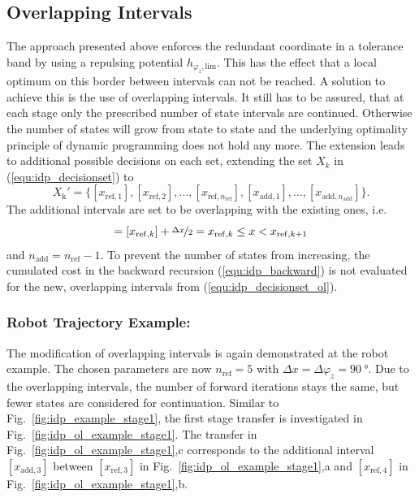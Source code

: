 \documentclass[runningheads]{llncs}
\begin{document}
\subsection{Overlapping Intervals}
\label{sec:overlapping}

The approach presented above enforces the redundant coordinate in a tolerance band by using a repulsing potential $h_{\varphi_{z},\mathrm{lim}}$.
This has the effect that a local optimum on this border between intervals can not be reached.
A solution to achieve this is the use of overlapping intervals.
It still has to be assured, that at each stage only the prescribed number of state intervals are continued.
Otherwise the number of states will grow from state to state and the underlying optimality principle of dynamic programming does not hold any more.
The extension leads to additional possible decisions on each set, extending the set $X_k$ in (\ref{equ:idp_decisionset}) to
%
\begin{equation}
X_\mathrm{k}'=
\{
[x_{\mathrm{ref},1}],[x_{\mathrm{ref},2}],...,[x_{\mathrm{ref},n_{\mathrm{ref}}}],
[x_{\mathrm{add},1}],...,[x_{\mathrm{add},n_{\mathrm{add}}}]
\}.
\label{equ:idp_decisionset_ol}
\end{equation}
%
The additional intervals are set to be overlapping with the existing ones, i.e.
%
\begin{equation}
[x_{\mathrm{add},k}]=[x_{\mathrm{ref},k}]+\nicefrac{\Delta x}{2}
= x_{\mathrm{ref},k} \le x <  x_{\mathrm{ref},k+1}
\end{equation}
%
and $n_{\mathrm{add}}=n_{\mathrm{ref}}-1$.
To prevent the number of states from increasing, the cumulated cost in the backward recursion (\ref{equ:idp_backward}) is not evaluated for the new, overlapping intervals from (\ref{equ:idp_decisionset_ol}).

\subsubsection{Robot Trajectory Example:}
The modification of overlapping intervals is again demonstrated at the robot example.
The chosen parameters are now $n_\mathrm{ref}=5$ with $\Delta x = \Delta \varphi_{z} = \SI{90}{\degree}$.
Due to the overlapping intervals, the number of forward iterations stays the same, but fewer states are considered for continuation.
Similar to Fig.~\ref{fig:idp_example_stage1}, the first stage transfer is investigated in Fig.~\ref{fig:idp_ol_example_stage1}.
The transfer in Fig.~\ref{fig:idp_ol_example_stage1},c corresponds to the additional interval $[x_{\mathrm{add},3}]$ between $[x_{\mathrm{ref},3}]$ in Fig.~\ref{fig:idp_ol_example_stage1},a and $[x_{\mathrm{ref},4}]$ in Fig.~\ref{fig:idp_ol_example_stage1},b.
\end{document}
